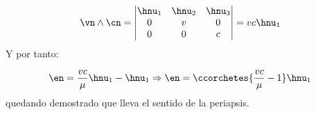 	\begin{equation}
		\vn \wedge \cn = \begin{vmatrix}
			\hnu_1 & \hnu_2 & \hnu_3 \\
			0      & v      & 0      \\
			0      & 0      & c
		\end{vmatrix} = v c \hnu_1
	\end{equation}
	Y por tanto:

	\begin{equation}
		\en = \frac{vc}{\mu} \hnu_1 - \hnu_1 \Rightarrow \en = \ccorchetes{\frac{vc}{\mu}-1}\hnu_1
	\end{equation}
	quedando demostrado que lleva el sentido de la periapsis.
